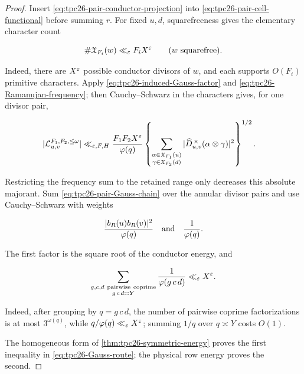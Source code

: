 \begin{proof}
Insert \eqref{eq:tpc26-pair-conductor-projection} into
\eqref{eq:tpc26-pair-cell-functional} before summing \(r\).  For fixed
\(u,d\), squarefreeness gives the elementary character count

\begin{equation}
 \#\mathfrak X_{F_i}(w)\ll_\varepsilon F_iX^\varepsilon
 \qquad(w\text{ squarefree}).
 \label{eq:tpc26-cell-character-count}
\end{equation}

Indeed, there are \(X^\varepsilon\) possible conductor divisors of \(w\), and
each supports \(O(F_i)\) primitive characters.  Apply
\eqref{eq:tpc26-induced-Gauss-factor} and
\eqref{eq:tpc26-Ramanujan-frequency}; then Cauchy--Schwarz in the
characters gives, for one divisor pair,

\begin{align}
 |\mathcal L_{u,v}^{F_1,F_2,\le\omega}|
 \ll_{\varepsilon,F,H}{}&
 \frac{F_1F_2X^\varepsilon}{\varphi(q)}
 \left\{
 \sum_{\substack{\alpha\in\mathfrak X_{F_1}(u)\\
                   \gamma\in\mathfrak X_{F_2}(d)}}
 |\widehat D_{u,v}^{\,\times}(\alpha\otimes\gamma)|^2
 \right\}^{1/2}.
 \label{eq:tpc26-pair-Gauss-chain}
\end{align}

Restricting the frequency sum to the retained range only decreases this
absolute majorant.  Sum \eqref{eq:tpc26-pair-Gauss-chain} over the
annular divisor pairs and use Cauchy--Schwarz with weights

\[
 \frac{|b_R(u)b_R(v)|^2}{\varphi(q)}
 \quad\hbox{and}\quad
 \frac1{\varphi(q)}.
\]

The first factor is the square root of the conductor energy, and

\begin{equation}
 \sum_{\substack{g,c,d\ \mathrm{pairwise\ coprime}\\
                  g\,c\,d\asymp Y}}
 \frac1{\varphi(g\,c\,d)}
 \ll_\eps X^\eps.
 \label{eq:tpc26-reciprocal-phi-triples}
\end{equation}

Indeed, after grouping by \(q=g\,c\,d\), the number of pairwise
coprime factorizations is at most \(3^{\omega(q)}\), while
\(q/\varphi(q)\ll_\varepsilon X^\varepsilon\); summing \(1/q\) over \(q\asymp Y\)
costs \(O(1)\).

The homogeneous form of \cref{thm:tpc26-symmetric-energy} proves the
first inequality in \eqref{eq:tpc26-Gauss-route}; the physical row
energy proves the second.
\end{proof}

